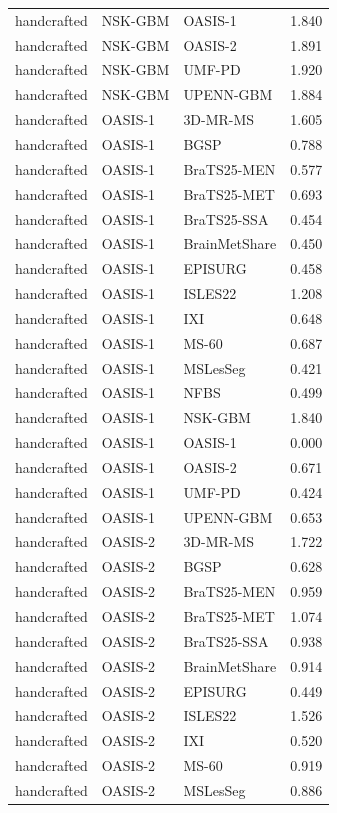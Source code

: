 \begin{tabular}{lllr}
handcrafted & NSK-GBM & OASIS-1 & 1.840 \\
handcrafted & NSK-GBM & OASIS-2 & 1.891 \\
handcrafted & NSK-GBM & UMF-PD & 1.920 \\
handcrafted & NSK-GBM & UPENN-GBM & 1.884 \\
handcrafted & OASIS-1 & 3D-MR-MS & 1.605 \\
handcrafted & OASIS-1 & BGSP & 0.788 \\
handcrafted & OASIS-1 & BraTS25-MEN & 0.577 \\
handcrafted & OASIS-1 & BraTS25-MET & 0.693 \\
handcrafted & OASIS-1 & BraTS25-SSA & 0.454 \\
handcrafted & OASIS-1 & BrainMetShare & 0.450 \\
handcrafted & OASIS-1 & EPISURG & 0.458 \\
handcrafted & OASIS-1 & ISLES22 & 1.208 \\
handcrafted & OASIS-1 & IXI & 0.648 \\
handcrafted & OASIS-1 & MS-60 & 0.687 \\
handcrafted & OASIS-1 & MSLesSeg & 0.421 \\
handcrafted & OASIS-1 & NFBS & 0.499 \\
handcrafted & OASIS-1 & NSK-GBM & 1.840 \\
handcrafted & OASIS-1 & OASIS-1 & 0.000 \\
handcrafted & OASIS-1 & OASIS-2 & 0.671 \\
handcrafted & OASIS-1 & UMF-PD & 0.424 \\
handcrafted & OASIS-1 & UPENN-GBM & 0.653 \\
handcrafted & OASIS-2 & 3D-MR-MS & 1.722 \\
handcrafted & OASIS-2 & BGSP & 0.628 \\
handcrafted & OASIS-2 & BraTS25-MEN & 0.959 \\
handcrafted & OASIS-2 & BraTS25-MET & 1.074 \\
handcrafted & OASIS-2 & BraTS25-SSA & 0.938 \\
handcrafted & OASIS-2 & BrainMetShare & 0.914 \\
handcrafted & OASIS-2 & EPISURG & 0.449 \\
handcrafted & OASIS-2 & ISLES22 & 1.526 \\
handcrafted & OASIS-2 & IXI & 0.520 \\
handcrafted & OASIS-2 & MS-60 & 0.919 \\
handcrafted & OASIS-2 & MSLesSeg & 0.886 \\

\end{tabular}
